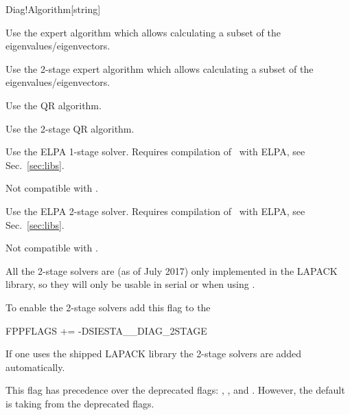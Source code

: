 \begin{fdfentry}{Diag!Algorithm}[string]
\begin{fdfoptions}
    \option[expert]%
    
    Use the expert algorithm which allows calculating a subset of the
    eigenvalues/eigenvectors.



    Use the 2-stage expert algorithm which allows calculating a subset
    of the eigenvalues/eigenvectors.

    
    \option[noexpert|QR]%

    Use the QR algorithm.


    Use the 2-stage QR algorithm.

    
    
    Use the ELPA\cite{ELPA,ELPA-1} 1-stage solver. Requires
    compilation of \siesta\ with ELPA, see Sec.~\ref{sec:libs}.

    Not compatible with .

    
    Use the ELPA\cite{ELPA,ELPA-1} 2-stage solver. Requires
    compilation of \siesta\ with ELPA, see Sec.~\ref{sec:libs}.

    Not compatible with .

  \end{fdfoptions}

  \note All the 2-stage solvers are (as of July 2017) only
  implemented in the LAPACK library, so they will only be usable in
  serial or when using .

  To enable the 2-stage solvers add this flag to the 
  \begin{shellexample}
    FPPFLAGS += -DSIESTA__DIAG_2STAGE
  \end{shellexample}

  If one uses the shipped LAPACK library the 2-stage solvers are added
  automatically.


  \note This flag has precedence over the deprecated flags:
  , ,  and
  . However, the default is taking from the
  deprecated flags.
  
\end{fdfentry}


